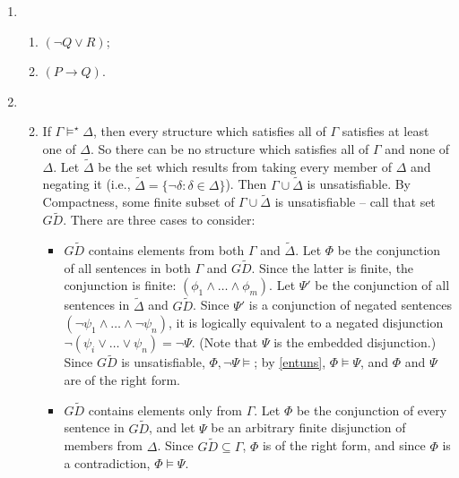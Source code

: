 {\begin{enumerate}
\begin{enumerate}
	There are 16 2-place truth-functions. But 12 of them are such that either the top line or bottom line of the truth-table are the same, or the two middle lines of the truth table are the same. So only 4 could be self-dual: the four degenerate truth-functions that track their first input or second input or their negations, $f_{\text{left}}, f_{\text{n-left}}, f_{\text{right}}, f_{\text{n-right}}$. These are self-dual, basically because when we `flip' the truth table, these functions directly follow the flipped inputs to the truth-functions, undistorted by any contribution from the other input.
\end{enumerate}
\setcounter{enumi}{8}
\item \begin{enumerate}
	\item $(¬Q \vee R)$;
	\setcounter{enumii}{2}
	\item $(P\to Q)$.
\end{enumerate}
\item \begin{enumerate}
	\setcounter{enumii}{1} \item If $\Gamma \vDash^{\!\star} \Delta$, then every structure which satisfies all of $\Gamma$ satisfies at least one of $\Delta$. So there can be no structure which satisfies all of $\Gamma$ and none of $\Delta$. Let $\widetilde{\Delta}$ be the set which results from taking every member of $\Delta$ and negating it (i.e., $\widetilde{\Delta} = \{\neg\delta : \delta\in \Delta\}$). Then $\Gamma\cup\widetilde{\Delta}$ is unsatisfiable. By Compactness, some finite subset of $\Gamma\cup\widetilde{\Delta}$ is unsatisfiable – call that set $G\widetilde{D}$. There are three cases to consider: \begin{itemize}
		\item $G\widetilde{D}$ contains elements from both $\Gamma$ and $\widetilde{\Delta}$. Let $\Phi$ be the conjunction of all sentences in both $\Gamma$ and $G\widetilde{D}$. Since the latter is finite, the conjunction is finite: $(\phi_{1}\wedge…\wedge \phi_{m})$. Let $\Psi'$ be the conjunction of all sentences in $\widetilde{\Delta}$ and $G\widetilde{D}$. Since $\Psi'$ is a conjunction of negated sentences $(\neg\psi_{1}\wedge…\wedge ¬\psi_{n})$, it is logically equivalent to a negated disjunction $¬(\psi_{i}\vee…\vee \psi_{n}) = ¬\Psi$. (Note that $\Psi$ is the embedded disjunction.) Since $G\widetilde{D}$ is unsatisfiable, $\Phi,¬ \Psi \vDash$; by \autoref{entuns}, $\Phi\vDash \Psi$, and $\Phi$ and $\Psi$ are of the right form.
		\item $G\widetilde{D}$ contains elements only from $\Gamma$. Let $\Phi$ be the conjunction of every sentence in $G\widetilde{D}$, and let $\Psi$ be an arbitrary finite disjunction of members from $\Delta$. Since $G\widetilde{D}\subseteq \Gamma$, $\Phi$ is of the right form, and since $\Phi$ is a contradiction, $\Phi\vDash\Psi$.

\end{itemize}
\end{enumerate}
\end{enumerate}}
